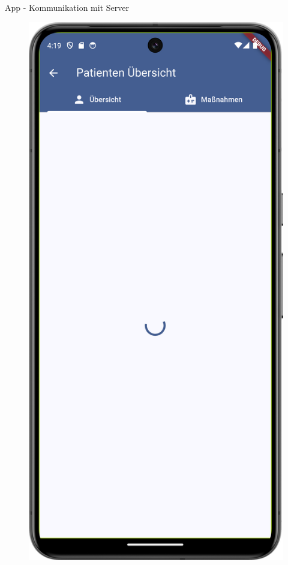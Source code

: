\begin{frame}{App - Kommunikation mit Server}
    \vfill
    \begin{figure}
        \centering
        \begin{minipage}{0.3\textwidth}
            \centering
            \includegraphics[height=0.8\textheight]{images/app/screenshots/concurrency_loading.png}

\end{minipage}
\end{figure}
\end{frame}
